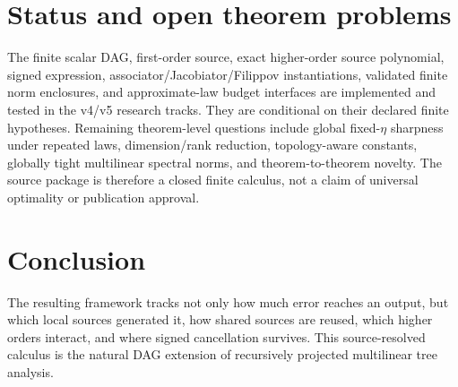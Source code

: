 \documentclass[11pt]{amsart}
\theoremstyle{definition}
\theoremstyle{remark}
\begin{document}
\section{Status and open theorem problems}

The finite scalar DAG, first-order source, exact higher-order source
polynomial, signed expression, associator/Jacobiator/Filippov instantiations,
validated finite norm enclosures, and approximate-law budget interfaces are
implemented and tested in the v4/v5 research tracks. They are conditional on
their declared finite hypotheses. Remaining theorem-level questions include
global fixed-$\eta$ sharpness under repeated laws, dimension/rank reduction,
topology-aware constants, globally tight multilinear spectral norms, and
theorem-to-theorem novelty. The source package is therefore a closed finite
calculus, not a claim of universal optimality or publication approval.

\section{Conclusion}

The resulting framework tracks not only how much error reaches an output, but
which local sources generated it, how shared sources are reused, which higher
orders interact, and where signed cancellation survives. This source-resolved
calculus is the natural DAG extension of recursively projected multilinear
tree analysis.

\nocite{Yau2016,LodayVallette2012,Higham2002,KoldaBader2009,MooreKearfottCloud2009,ChenSuranaBlochRajapakse2019,WeissRubioLiblit2015}


\end{document}
